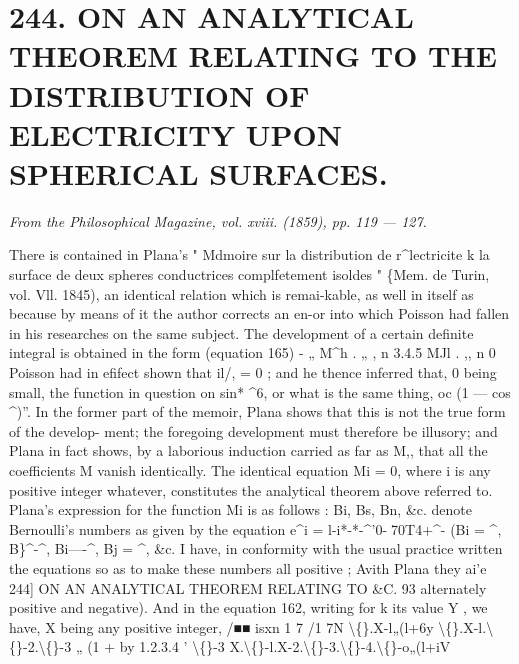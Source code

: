 \documentclass[11pt,a4paper]{book}
\begin{document}
\section*{244. ON  AN  ANALYTICAL  THEOREM  RELATING  TO  THE  DISTRIBUTION OF  ELECTRICITY  UPON  SPHERICAL  SURFACES.}
\begin{flushright}
\textit{From  the  Philosophical  Magazine,  vol.  xviii.  (1859),  pp.  119 — 127.}\n\end{flushright}
\vspace{0.5em}
There  is  contained  in  Plana's  "  Mdmoire  sur  la  distribution  de  r^lectricite  k  la
surface  de  deux  spheres  conductrices  complfetement  isoldes  "  \{Mem.  de  Turin,  vol.  Vll.  1845),
an  identical  relation  which  is  remai-kable,  as  well  in  itself  as  because  by  means  of
it  the  author  corrects  an  en-or  into  which  Poisson  had  fallen  in  his  researches  on  the
same  subject.  The  development  of  a  certain  definite  integral  is  obtained  in  the  form
(equation  165)
-     „  M^h    .    „  ,  n       3.4.5   MJl     .    ,,  n        0
Poisson  had  in  efifect  shown  that  il/,  =  0 ;  and  he  thence  inferred  that,  0  being  small,
the  function  in  question  on  sin*  ^6,  or  what  is  the  same  thing,  oc  (1  —  cos  ^)''.  In  the
former  part  of  the  memoir,  Plana  shows  that  this  is  not  the  true  form  of  the  develop-
ment; the  foregoing  development  must  therefore  be  illusory;  and  Plana  in  fact  shows,
by  a  laborious  induction  carried  as  far  as  M,,  that  all  the  coefficients  M  vanish
identically.  The  identical  equation  Mi  =  0,  where  i  is  any  positive  integer  whatever,
constitutes  the  analytical  theorem  above  referred  to.  Plana's  expression  for  the  function
Mi  is  as  follows  :
Bi,  Bs,  Bn,  \&c.  denote  Bernoulli's  numbers  as  given  by  the  equation
e^i  =  l-i*-*-^'0-^^T70T4+^-
(Bi  =  ^,   B\}^-^,    Bi—-^,    Bj  =  ^,    \&c.   I   have,   in    conformity   with    the    usual    practice
written  the  equations  so  as  to  make  these  numbers  all  positive  ;   Avith   Plana  they  ai'e
244]  ON    AN    ANALYTICAL    THEOREM   RELATING    TO    \&C.  93
alternately  positive   and  negative).     And   in    the   equation   162,   writing    for  k  its   value
Y ,  we  have,  X  being  any  positive  integer,
/■■      isxn  1         7  /1      7N  \textbackslash\{\}.X-l„(l+6y
\textbackslash\{\}.X-l.\textbackslash\{\}-2.\textbackslash\{\}-3  „  (1  +  by
1.2.3.4  '  \textbackslash\{\}-3
X.\textbackslash\{\}-l.X-2.\textbackslash\{\}-3.\textbackslash\{\}-4.\textbackslash\{\}-o„(l+iV
\end{document}
